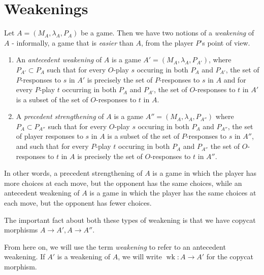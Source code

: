 \documentclass[11pt]{article} %
\theoremstyle{plain} %
\theoremstyle{definition} %
\theoremstyle{exercisestyle}
\newcommand*\from{\colon}
\newcommand{\cmap}[3]{#1\from{}#2\to{}#3}
\DeclareMathOperator{\wk}{wk}
\begin{document}
\section{Weakenings}

Let $A=(M_A,\lambda_A,P_A)$ be a game.  Then we have two notions of a \emph{weakening} of $A$ - informally, a game that is \emph{easier} than $A$, from the player $P$'s point of view.  

\begin{enumerate}
  \item An \emph{antecedent weakening} of $A$ is a game $A'=(M_A,\lambda_A,P_{A'})$, where $P_{A'}\subset P_{A}$ such that for every $O$-play $s$ occuring in both $P_A$ and $P_{A'}$, the set of $P$-responses to $s$ in $A'$ is precisely the set of $P$-responses to $s$ in $A$ and for every $P$-play $t$ occurring in both $P_A$ and $P_{A'}$, the set of $O$-responses to $t$ in $A'$ is a subset of the set of $O$-responses to $t$ in $A$.  
  \item A \emph{precedent strengthening} of $A$ is a game $A''=(M_A,\lambda_A,P_{A''})$ where $P_A\subset P_{A''}$ such that for every $O$-play $s$ occuring in both $P_A$ and $P_{A''}$, the set of player responses to $s$ in $A$ is a subset of the set of $P$-responses to $s$ in $A''$, and such that for every $P$-play $t$ occuring in both $P_A$ and $P_{A''}$ the set of $O$-responses to $t$ in $A$ is precisely the set of $O$-responses to $t$ in $A''$.  
\end{enumerate}

In other words, a precedent strengthening of $A$ is a game in which the player has more choices at each move, but the opponent has the same choices, while an antecedent weakening of $A$ is a game in which the player has the same choices at each move, but the opponent has fewer choices.  

The important fact about both these types of weakening is that we have copycat morphisms $A\to A',A\to A''$.  

From here on, we will use the term \emph{weakening} to refer to an antecedent weakening.  If $A'$ is a weakening of $A$, we will write $\cmap{\wk}{A}{A'}$ for the copycat morphism.  
\end{document}
